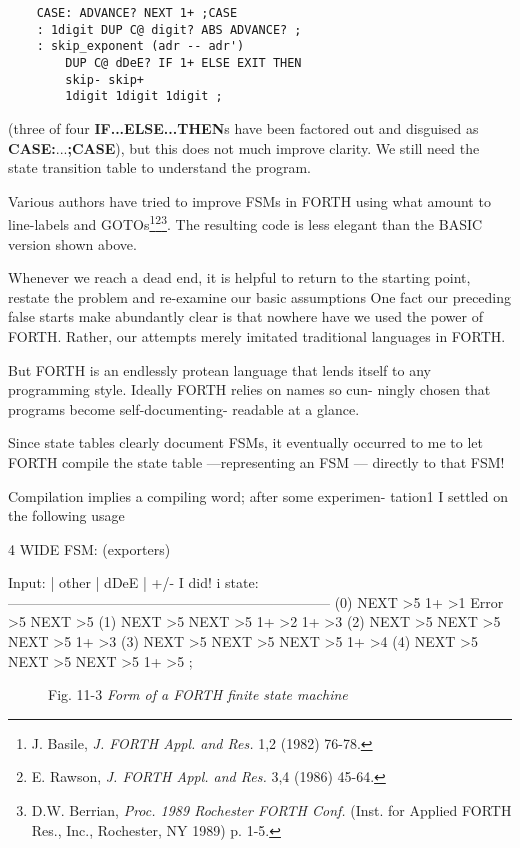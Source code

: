 \begin{verbatim}
    CASE: ADVANCE? NEXT 1+ ;CASE
    : 1digit DUP C@ digit? ABS ADVANCE? ;
    : skip_exponent (adr -- adr')
        DUP C@ dDeE? IF 1+ ELSE EXIT THEN
        skip- skip+
        1digit 1digit 1digit ;
\end{verbatim}

(three of four \textbf{IF...ELSE...THEN}s have been factored out and disguised as \textbf{CASE:}...\textbf{;CASE}), but this does not much improve clarity. We still need the state transition table to understand the program.

Various authors have tried to improve FSMs in FORTH using what amount to line-labels and GOTOs\footnote{J. Basile, \textit{J. FORTH Appl. and Res.} 1,2 (1982) 76-78.}\footnote{E. Rawson, \textit{J. FORTH Appl. and Res.} 3,4 (1986) 45-64.}\footnote{D.W. Berrian, \textit{Proc. 1989 Rochester FORTH Conf.} (Inst. for Applied FORTH Res., Inc., Rochester, NY 1989) p. 1-5.}. The resulting code is less elegant than the BASIC version shown above.

Whenever we reach a dead end, it is helpful to return to the
starting point, restate the problem and re-examine our basic
assumptions One fact our preceding false starts make abundantly
clear is that nowhere have we used the power of FORTH. Rather,
our attempts merely imitated traditional languages in FORTH.

But FORTH is an endlessly protean language that lends itself to
any programming style. Ideally FORTH relies on names so cun-
ningly chosen that programs become self-documenting-
readable at a glance.

Since state tables clearly document FSMs, it eventually occurred
to me to let FORTH compile the state table —representing an
FSM — directly to that FSM!

Compilation implies a compiling word; after some experimen-
tation1 I settled on the following usage

 

4 WIDE FSM: (exporters)

Input: | other | dDeE | +/- I did! i
state: ———————————————————————
(0) NEXT >5 1+ >1 Error >5 NEXT >5
(1) NEXT >5 NEXT >5 1+ >2 1+ >3
(2) NEXT >5 NEXT >5 NEXT >5 1+ >3
(3) NEXT >5 NEXT >5 NEXT >5 1+ >4
(4) NEXT >5 NEXT >5 NEXT >5 1+ >5 ;

\begin{figure}
    \caption{Fig. 11-3 \textit{Form of a FORTH finite state machine}}
\end{figure}





